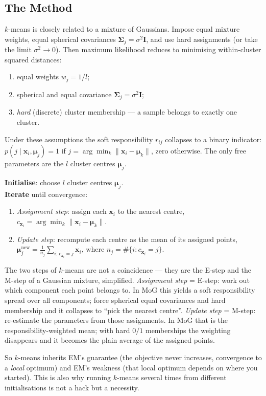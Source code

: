 \documentclass[11pt, oneside]{book}
\begin{document}
\subsection{The Method}

$k$-means is closely related to a mixture of Gaussians. Impose equal mixture weights,
equal spherical covariances $\bm{\Sigma}_j=\sigma^2\bm{I}$, and use hard assignments
(or take the limit $\sigma^2\to0$). Then maximum likelihood reduces to minimising
within-cluster squared distances:
\begin{enumerate}
  \item equal weights $w_j = 1/l$;
  \item spherical and equal covariance $\bm{\Sigma}_j = \sigma^2\bm{I}$;
  \item \emph{hard} (discrete) cluster membership — a sample belongs to
        exactly one cluster.
\end{enumerate}
Under these assumptions the soft responsibility $r_{ij}$ collapses to a
binary indicator: $p(j\mid\bm{x}_i,\bm{\mu}_j)=1$ if $j=\arg\min_k\|\bm{x}_i-\bm{\mu}_k\|$,
zero otherwise.
The only free parameters are the $l$ cluster centres $\bm{\mu}_j$.

\begin{defbox}[title={$k$-means algorithm}]
\textbf{Initialise}: choose $l$ cluster centres $\bm{\mu}_j$.\\
\textbf{Iterate} until convergence:
\begin{enumerate}
  \item \emph{Assignment step}: assign each $\bm{x}_i$ to the nearest centre,
        $c_{\bm{x}_i} = \arg\min_k\|\bm{x}_i - \bm{\mu}_k\|$.
  \item \emph{Update step}: recompute each centre as the mean of its
        assigned points,
        $\bm{\mu}_j^{\text{new}} = \frac{1}{n_j}\sum_{i:\,c_{\bm{x}_i}=j}\bm{x}_i$,
        where $n_j = \#\{i : c_{\bm{x}_i}=j\}$.
\end{enumerate}
\end{defbox}

\begin{intbox}[title={$k$-means \emph{is} EM, with the soft edges sanded off}]
The two steps of $k$-means are not a coincidence --- they are the E-step and the
M-step of a Gaussian mixture, simplified.
\emph{Assignment step} = E-step: work out which component each point belongs to.
In MoG this yields a soft responsibility spread over all components; force
spherical equal covariances and hard membership and it collapses to ``pick the
nearest centre''.
\emph{Update step} = M-step: re-estimate the parameters from those assignments.
In MoG that is the responsibility-weighted mean; with hard $0/1$ memberships the
weighting disappears and it becomes the plain average of the assigned points.

So $k$-means inherits EM's guarantee (the objective never increases, convergence
to a \emph{local} optimum) and EM's weakness (that local optimum depends on where
you started).
This is also why running $k$-means several times from different initialisations is
not a hack but a necessity.
\end{intbox}
\end{document}
